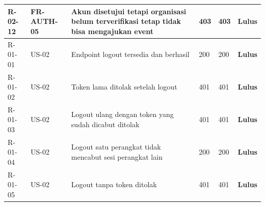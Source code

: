 \documentclass[11pt,a4paper]{article}
\begin{document}
{\begin{longtable}{p{1.8cm}p{1.9cm}p{4.0cm}p{2.4cm}p{3.4cm}p{1.2cm}}
\midrule
\mbox{R-02-12} & FR-AUTH-05 & Akun disetujui tetapi organisasi belum terverifikasi tetap tidak bisa mengajukan event & 403 & 403 & \textbf{Lulus}\\
\midrule
\mbox{R-01-01} & US-02 & Endpoint logout tersedia dan berhasil & 200 & 200 & \textbf{Lulus}\\
\midrule
\mbox{R-01-02} & US-02 & Token lama ditolak setelah logout & 401 & 401 & \textbf{Lulus}\\
\midrule
\mbox{R-01-03} & US-02 & Logout ulang dengan token yang sudah dicabut ditolak & 401 & 401 & \textbf{Lulus}\\
\midrule
\mbox{R-01-04} & US-02 & Logout satu perangkat tidak mencabut sesi perangkat lain & 200 & 200 & \textbf{Lulus}\\
\midrule
\mbox{R-01-05} & US-02 & Logout tanpa token ditolak & 401 & 401 & \textbf{Lulus}\\
\midrule
\bottomrule
\end{longtable}}
\end{document}
